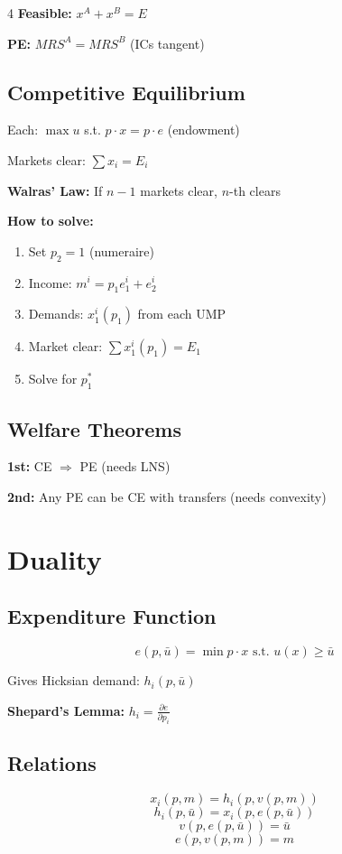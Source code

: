 \documentclass[8pt,landscape]{article}
\begin{document}
\begin{multicols}{4}
\textbf{Feasible:} $x^A + x^B = E$

\textbf{PE:} $MRS^A = MRS^B$ (ICs tangent)

\subsection{Competitive Equilibrium}
Each: $\max u$ s.t. $p \cdot x = p \cdot e$ (endowment)

Markets clear: $\sum x_i = E_i$

\textbf{Walras' Law:} If $n-1$ markets clear, $n$-th clears

\textbf{How to solve:}
\begin{enumerate}
    \item Set $p_2 = 1$ (numeraire)
    \item Income: $m^i = p_1 e_1^i + e_2^i$
    \item Demands: $x_1^i(p_1)$ from each UMP
    \item Market clear: $\sum x_1^i(p_1) = E_1$
    \item Solve for $p_1^*$
\end{enumerate}

\subsection{Welfare Theorems}
\textbf{1st:} CE $\Rightarrow$ PE (needs LNS)

\textbf{2nd:} Any PE can be CE with transfers (needs convexity)

\section{Duality}

\subsection{Expenditure Function}
$$e(p, \bar{u}) = \min p \cdot x \text{ s.t. } u(x) \geq \bar{u}$$

Gives Hicksian demand: $h_i(p, \bar{u})$

\textbf{Shepard's Lemma:} $h_i = \frac{\partial e}{\partial p_i}$

\subsection{Relations}
$$x_i(p, m) = h_i(p, v(p, m))$$
$$h_i(p, \bar{u}) = x_i(p, e(p, \bar{u}))$$
$$v(p, e(p, \bar{u})) = \bar{u}$$
$$e(p, v(p, m)) = m$$


\end{multicols}
\end{document}
